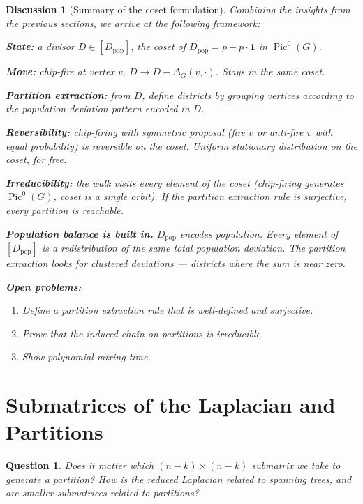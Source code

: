 \documentclass[11pt]{article}
\newcommand{\Pic}{\operatorname{Pic}^0}
\newtheorem{question}{Question}
\newtheorem{answer}{Discussion}
\begin{document}
\begin{answer}[Summary of the coset formulation]
Combining the insights from the previous sections, we arrive at the following
framework:

\textbf{State:} a divisor $D \in [D_{\mathrm{pop}}]$, the coset of
$D_{\mathrm{pop}} = p - \bar{p} \cdot \mathbf{1}$ in $\Pic(G)$.

\textbf{Move:} chip-fire at vertex $v$. $D \to D - \Delta_G(v, \cdot)$. Stays
in the same coset.

\textbf{Partition extraction:} from $D$, define districts by grouping vertices
according to the population deviation pattern encoded in $D$.

\textbf{Reversibility:} chip-firing with symmetric proposal (fire $v$ or
anti-fire $v$ with equal probability) is reversible on the coset. Uniform
stationary distribution on the coset, for free.

\textbf{Irreducibility:} the walk visits every element of the coset
(chip-firing generates $\Pic(G)$, coset is a single orbit). If the partition
extraction rule is surjective, every partition is reachable.

\textbf{Population balance is built in.} $D_{\mathrm{pop}}$ encodes
population. Every element of $[D_{\mathrm{pop}}]$ is a redistribution of the
same total population deviation. The partition extraction looks for clustered
deviations --- districts where the sum is near zero.

\textbf{Open problems:}
\begin{enumerate}
  \item Define a partition extraction rule that is well-defined and surjective.
  \item Prove that the induced chain on partitions is irreducible.
  \item Show polynomial mixing time.
\end{enumerate}
\end{answer}


\section{Submatrices of the Laplacian and Partitions}

\begin{question}
Does it matter which $(n-k) \times (n-k)$ submatrix we take to generate a
partition? How is the reduced Laplacian related to spanning trees, and are
smaller submatrices related to partitions?
\end{question}
\end{document}
